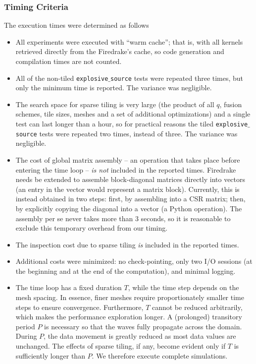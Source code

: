 \subsubsection{Timing Criteria}
The execution times were determined as follows
\begin{itemize}
\item All experiments were executed with ``warm cache''; that is, with all kernels retrieved directly from the Firedrake's cache, so code generation and compilation times are not counted.
\item All of the non-tiled {\tt explosive$\_$source} tests were repeated three times, but only the minimum time is reported. The variance was negligible. 
\item The search space for sparse tiling is very large (the product of all $q$, fusion schemes, tile sizes, meshes and a set of additional optimizations) and a single test can last longer than a hour, so for practical reasons the tiled {\tt explosive$\_$source} tests were repeated two times, instead of three. The variance was negligible.
\item The cost of global matrix assembly -- an operation that takes place before entering the time loop -- {\it is not} included in the reported times. Firedrake needs be extended to assemble block-diagonal matrices directly into vectors (an entry in the vector would represent a matrix block). Currently, this is instead obtained in two steps: first, by assembling into a CSR matrix; then, by explicitly copying the diagonal into a vector (a Python operation). The assembly per se never takes more than 3 seconds, so it is reasonable to exclude this temporary overhead from our timing.
\item The inspection cost due to sparse tiling {\it is} included in the reported times.
\item Additional costs were minimized: no check-pointing, only two I/O sessions (at the beginning and at the end of the computation), and minimal logging.
\item The time loop has a fixed duration $T$, while the time step depends on the mesh spacing. In essence, finer meshes require proportionately smaller time steps to ensure convergence. Furthermore, $T$ cannot be reduced arbitrarily, which makes the performance exploration longer. A (prolonged) transitory period $P$ is necessary so that the waves fully propagate across the domain. During $P$, the data movement is greatly reduced as most data values are unchanged. The effects of sparse tiling, if any, become evident only if $T$ is sufficiently longer than $P$. We therefore execute complete simulations.
\end{itemize}



